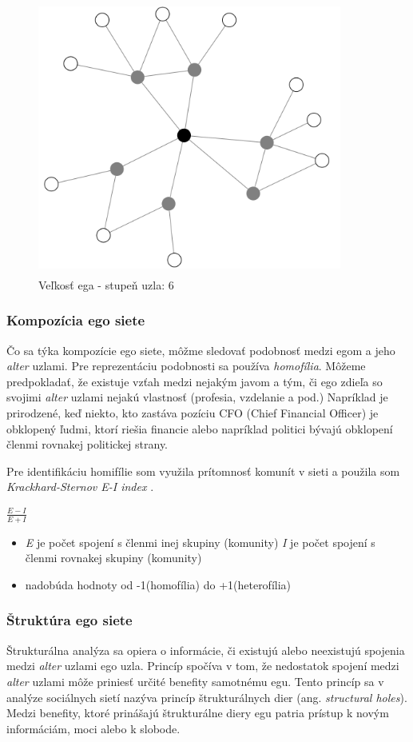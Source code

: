 \documentclass[slovak,master,public,dept460,male,cpdeclaration,oneside]{diploma}
\begin{document}
\begin{figure}[H]
\centering
\includegraphics[width=10cm, height=9cm]{figures/egonet}
\caption{Veľkosť ega - stupeň uzla: 6}
\end{figure}

\subsubsection{Kompozícia ego siete}
Čo sa týka kompozície ego siete, môžme sledovať podobnosť medzi egom a jeho \textit{alter} uzlami. Pre reprezentáciu podobnosti sa používa \textit{homofília}. Môžeme predpokladať, že existuje vzťah medzi nejakým javom a tým, či ego zdieľa so svojimi \textit{alter} uzlami nejakú vlastnosť (profesia, vzdelanie a pod.) Napríklad je prirodzené, keď niekto, kto zastáva pozíciu CFO (Chief Financial Officer) je obklopený ľudmi, ktorí riešia financie alebo napríklad politici bývajú obklopení členmi rovnakej politickej strany. 

Pre identifikáciu homifílie som využila prítomnosť komunít v sieti a použila som \textit{Krackhard-Sternov E-I index}  \cite{22}.

${
\frac{E-I}{E+I}
}$

\begin{itemize}
\item \textit{E} je počet spojení s členmi inej skupiny (komunity) \textit{I} je počet spojení s členmi rovnakej skupiny (komunity)
\item nadobúda hodnoty od -1(homofília) do +1(heterofília)
\end{itemize}



\subsubsection{Štruktúra ego siete}
Štrukturálna analýza sa opiera o informácie, či existujú alebo neexistujú spojenia medzi \textit{alter} uzlami ego uzla. Princíp spočíva v tom, že nedostatok spojení medzi \textit{alter} uzlami môže priniesť určité benefity samotnému egu. Tento princíp sa v analýze sociálnych sietí nazýva princíp štrukturálnych dier (ang. \textit{structural holes}). Medzi benefity, ktoré prinášajú štrukturálne diery egu patria prístup k novým informáciám, moci alebo k slobode.
\end{document}
